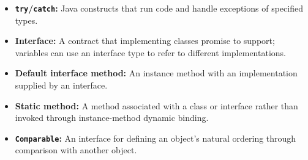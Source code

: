 \documentclass[11pt]{article}
\newenvironment{DottedList}{%
  \begin{itemize}[leftmargin=2em, itemsep=0.35em, topsep=0.35em, label=\textbullet]
}{%
  \end{itemize}
}
\begin{document}
\begin{DottedList}
  \item \textbf{\texttt{try}/\texttt{catch}:} Java constructs that run code and handle exceptions of specified types.
  \item \textbf{Interface:} A contract that implementing classes promise to support; variables can use an interface type to refer to different implementations.
  \item \textbf{Default interface method:} An instance method with an implementation supplied by an interface.
  \item \textbf{Static method:} A method associated with a class or interface rather than invoked through instance-method dynamic binding.
  \item \textbf{\texttt{Comparable}:} An interface for defining an object's natural ordering through comparison with another object.
\end{DottedList}
\end{document}
